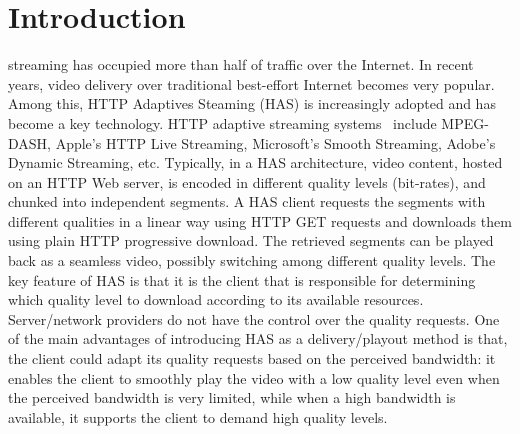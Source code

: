 \documentclass[journal]{IEEEtran}
\begin{document}
%
\IEEEpeerreviewmaketitle



\section{Introduction}
% 
% 
% 
% 
 streaming has occupied more than half of traffic over the Internet. In recent years, video delivery over traditional best-effort Internet becomes very popular. Among this, HTTP Adaptives Steaming (HAS) is increasingly adopted and has become a key technology. HTTP adaptive streaming systems~\cite{stockhammer2011dynamic} include MPEG-DASH, Apple's HTTP Live Streaming, Microsoft’s Smooth Streaming, Adobe’s Dynamic Streaming, etc. Typically, in a HAS architecture, video content, hosted on an HTTP Web server, is encoded in different quality levels (bit-rates), and chunked into independent segments. A HAS client requests the segments with different qualities in a linear way using HTTP GET requests and downloads them using plain HTTP progressive download. The retrieved segments can be played back as a seamless video, possibly switching among different quality levels. The key feature of HAS is that it is the client that is responsible for determining which quality level to download according to its available resources. Server/network providers do not have the control over the quality requests.  
One of the main advantages of introducing HAS as a delivery/playout method is that, the client could adapt its quality requests based on the perceived bandwidth: it enables the client to smoothly play the video with a low quality level even when the perceived bandwidth is very limited, while when a high bandwidth is available, it supports the client to demand high quality levels.  
\end{document}
